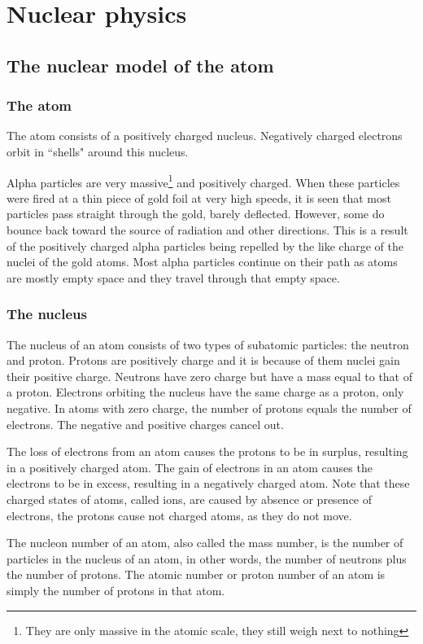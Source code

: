 \section{Nuclear physics}
\subsection{The nuclear model of the atom}
\subsubsection{The atom}
The atom consists of a positively charged nucleus.
Negatively charged electrons orbit in ``shells" around this nucleus.

Alpha particles are very massive\footnote{They are only massive in the atomic scale, they still
weigh next to nothing} and positively charged. When these particles were fired at a thin piece of
gold foil at very high speeds, it is seen that most particles pass straight through the gold, 
barely deflected. However, some do bounce back toward the source of radiation and other directions.
This is a result of the positively charged alpha particles being repelled by the like charge of the
nuclei of the gold atoms. Most alpha particles continue on their path as atoms are mostly empty 
space and they travel through that empty space.

\subsubsection{The nucleus}
The nucleus of an atom consists of two types of subatomic particles: the neutron and proton. 
Protons are positively charge and it is because of them nuclei gain their positive charge. Neutrons
have zero charge but have a mass equal to that of a proton. Electrons orbiting the nucleus
have the same charge as a proton, only negative. In atoms with zero charge, the number
of protons equals the number of electrons. The negative and positive charges cancel out.

The loss of electrons from an atom causes the protons to be in surplus, resulting in a positively
charged atom. The gain of electrons in an atom causes the electrons to be in excess, resulting in
a negatively charged atom. Note that these charged states of atoms, called ions, are caused by
absence or presence of electrons, the protons cause not charged atoms, as they do not move.

The nucleon number of an atom, also called the mass number, is the number of particles in the
nucleus of an atom, in other words, the number of neutrons plus the number of protons. The atomic
number or proton number of an atom is simply the number of protons in that atom.

